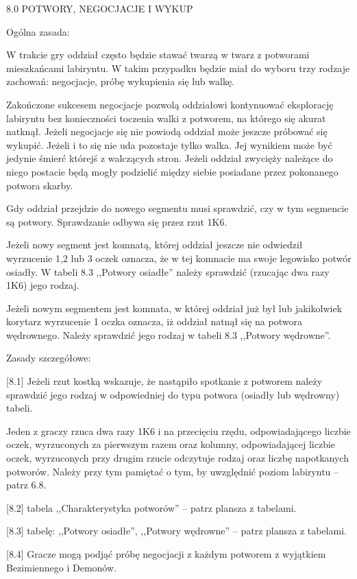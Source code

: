 8.0 POTWORY, NEGOCJACJE I WYKUP

Ogólna zasada:

W trakcie gry oddział często będzie stawać twarzą w twarz z potworami mieszkańcami labiryntu.
W takim przypadku będzie miał do wyboru trzy rodzaje zachowań: negocjacje, próbę wykupienia się lub walkę.

Zakończone sukcesem negocjacje pozwolą oddziałowi kontynuować eksplorację labiryntu bez konieczności toczenia walki z potworem, na którego się akurat natknął.
Jeżeli negocjacje się nie powiodą oddział może jeszcze próbować się wykupić.
Jeżeli i to się nie uda pozostaje tylko walka.
Jej wynikiem może być jedynie śmierć którejś z walczących stron.
Jeżeli oddział zwycięży należące do niego postacie będą mogły podzielić między siebie posiadane przez pokonanego potwora skarby.

Gdy oddział przejdzie do nowego segmentu musi sprawdzić, czy w tym segmencie są potwory.
Sprawdzanie odbywa się przez rzut 1K6.

Jeżeli nowy segment jest komnatą, której oddział jeszcze nie odwiedził wyrzucenie 1,2 lub 3 oczek oznacza, że w tej komnacie ma swoje legowisko potwór osiadły.
W tabeli 8.3 ,,Potwory osiadłe'' należy sprawdzić (rzucając dwa razy 1K6) jego rodzaj.

Jeżeli nowym segmentem jest komnata, w której oddział już był lub jakikolwiek korytarz wyrzucenie 1 oczka oznacza, iż oddział natnął się na potwora wędrownego.
Należy sprawdzić jego rodzaj w tabeli 8.3 ,,Potwory wędrowne''.

Zasady szczegółowe:

[8.1] Jeżeli rzut kostką wskazuje, że nastąpiło spotkanie z potworem należy sprawdzić jego rodzaj w odpowiedniej do typu potwora (osiadły lub wędrowny) tabeli.

Jeden z graczy rzuca dwa razy 1K6 i na przecięciu rzędu, odpowiadającego liczbie oczek, wyrzuconych za pierwszym razem oraz kolumny, odpowiadającej liczbie oczek, wyrzuconych przy drugim rzucie odczytuje rodzaj oraz liczbę napotkanych potworów.
Należy przy tym pamiętać o tym, by uwzględnić poziom labiryntu – patrz 6.8.

[8.2] tabela ,,Charakterystyka potworów'' – patrz plansza z tabelami.

[8.3] tabelę: ,,Potwory osiadłe'', ,,Potwory wędrowne'' – patrz plansza z tabelami.

[8.4] Gracze mogą podjąć próbę negocjacji z każdym potworem z wyjątkiem Bezimiennego i Demonów.

